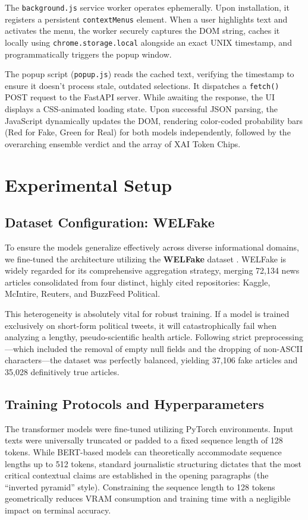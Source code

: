 \documentclass[conference]{IEEEtran}
\begin{document}
The \texttt{background.js} service worker operates ephemerally. Upon installation, it registers a persistent \texttt{contextMenus} element. When a user highlights text and activates the menu, the worker securely captures the DOM string, caches it locally using \texttt{chrome.storage.local} alongside an exact UNIX timestamp, and programmatically triggers the popup window.

The popup script (\texttt{popup.js}) reads the cached text, verifying the timestamp to ensure it doesn't process stale, outdated selections. It dispatches a \texttt{fetch()} POST request to the FastAPI server. While awaiting the response, the UI displays a CSS-animated loading state. Upon successful JSON parsing, the JavaScript dynamically updates the DOM, rendering color-coded probability bars (Red for Fake, Green for Real) for both models independently, followed by the overarching ensemble verdict and the array of XAI Token Chips. 

\section{Experimental Setup}

\subsection{Dataset Configuration: WELFake}
To ensure the models generalize effectively across diverse informational domains, we fine-tuned the architecture utilizing the \textbf{WELFake} dataset \cite{b16}. WELFake is widely regarded for its comprehensive aggregation strategy, merging 72,134 news articles consolidated from four distinct, highly cited repositories: Kaggle, McIntire, Reuters, and BuzzFeed Political. 

This heterogeneity is absolutely vital for robust training. If a model is trained exclusively on short-form political tweets, it will catastrophically fail when analyzing a lengthy, pseudo-scientific health article. Following strict preprocessing—which included the removal of empty null fields and the dropping of non-ASCII characters—the dataset was perfectly balanced, yielding 37,106 fake articles and 35,028 definitively true articles. 

\subsection{Training Protocols and Hyperparameters}
The transformer models were fine-tuned utilizing PyTorch environments. Input texts were universally truncated or padded to a fixed sequence length of 128 tokens. While BERT-based models can theoretically accommodate sequence lengths up to 512 tokens, standard journalistic structuring dictates that the most critical contextual claims are established in the opening paragraphs (the ``inverted pyramid'' style). Constraining the sequence length to 128 tokens geometrically reduces VRAM consumption and training time with a negligible impact on terminal accuracy.
\end{document}
